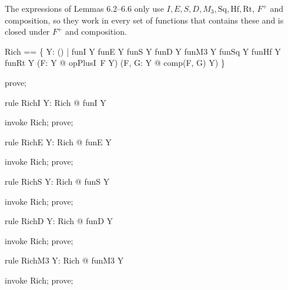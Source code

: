 \documentclass{article}
\begin{document}
The expressions of Lemmas 6.2--6.6 only use $I, E, S, D, M_3, \mathrm{Sq}, \mathrm{Hf}, \mathrm{Rt}$,
$F^+$ and composition, so they work in every set of functions that contains these and is closed
under $F^+$ and composition.

\begin{zed}
  Rich == \{ Y: \power (\nat \fun \nat) | funI \in Y \land funE \in Y \land funS \in Y \land funD \in Y \land funM3 \in Y \land funSq \in Y \land funHf \in Y \land funRt \in Y \land (\forall F: Y @ opPlusI~F \in Y) \land (\forall F, G: Y @ comp(F, G) \in Y) \}
\end{zed}

\begin{zproof}
prove;
\end{zproof}

\begin{theorem}{rule RichI}
  \forall Y: Rich @ funI \in Y
\end{theorem}

\begin{zproof}
invoke Rich;
prove;
\end{zproof}

\begin{theorem}{rule RichE}
  \forall Y: Rich @ funE \in Y
\end{theorem}

\begin{zproof}
invoke Rich;
prove;
\end{zproof}

\begin{theorem}{rule RichS}
  \forall Y: Rich @ funS \in Y
\end{theorem}

\begin{zproof}
invoke Rich;
prove;
\end{zproof}

\begin{theorem}{rule RichD}
  \forall Y: Rich @ funD \in Y
\end{theorem}

\begin{zproof}
invoke Rich;
prove;
\end{zproof}

\begin{theorem}{rule RichM3}
  \forall Y: Rich @ funM3 \in Y
\end{theorem}

\begin{zproof}
invoke Rich;
prove;
\end{zproof}
\end{document}
